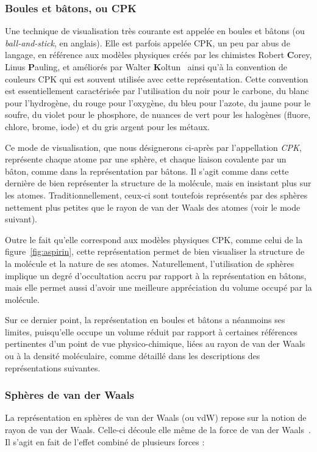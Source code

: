 \begin{appendices}
	\subsubsection{Boules et bâtons, ou CPK} Une technique de visualisation très courante est appelée \og en boules et bâtons \fg{} (ou \emph{ball-and-stick}, en anglais). Elle est parfois appelée CPK, un peu par abus de langage, en référence aux modèles physiques créés par les chimistes Robert \textbf{C}orey, Linus \textbf{P}auling, et améliorés par Walter \textbf{K}oltun~\cite{corey1953molecular, koltun1965space} ainsi qu'à la convention de couleurs CPK qui est souvent utilisée avec cette représentation. Cette convention est essentiellement caractérisée par l'utilisation du noir pour le carbone, du blanc pour l'hydrogène, du rouge pour l'oxygène, du bleu pour l'azote, du jaune pour le soufre, du violet pour le phosphore, de nuances de vert pour les halogènes (fluore, chlore, brome, iode) et du gris argent pour les métaux.
		
	Ce mode de visualisation, que nous désignerons ci-après par l'appellation \emph{CPK}, représente chaque atome par une sphère, et chaque liaison covalente par un bâton, comme dans la représentation par bâtons. Il s'agit comme dans cette dernière de bien représenter la structure de la molécule, mais en insistant plus sur les atomes. Traditionnellement, ceux-ci sont toutefois représentés par des sphères nettement plus petites que le rayon de van der Waals des atomes (voir le mode suivant).
		
	Outre le fait qu'elle correspond aux modèles physiques CPK, comme celui de la figure~\ref{fig:aspirin}, cette représentation permet de bien visualiser la structure de la molécule et la nature de ses atomes. Naturellement, l'utilisation de sphères implique un degré d'occultation accru par rapport à la représentation en bâtons, mais elle permet aussi d'avoir une meilleure appréciation du volume occupé par la molécule.
		
	Sur ce dernier point, la représentation en boules et bâtons a néanmoins ses limites, puisqu'elle occupe un volume réduit par rapport à certaines références pertinentes d'un point de vue physico-chimique, liées au rayon de van der Waals ou à la densité moléculaire, comme détaillé dans les descriptions des représentations suivantes.
		
	\subsubsection{Sphères de van der Waals} La représentation en sphères de van der Waals (ou vdW) repose sur la notion de rayon de van der Waals. Celle-ci découle elle même de la force de van der Waals~\cite{dzyaloshinskii1961general}. Il s'agit en fait de l'effet combiné de plusieurs forces :
	

\end{appendices}
